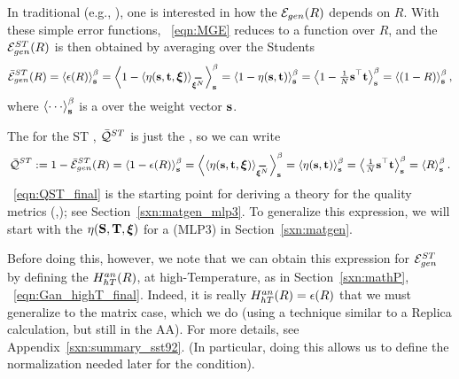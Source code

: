 
In traditional \STATMECH (e.g., \cite{SST92}), one is interested in how the \emph{\TotalModelGeneralizationError} ${\mathcal{E}}_{gen}(R)$ depends on $R$.
With these simple error functions, \EQN~\ref{eqn:MGE} reduces to a function over $R$,
and the \AverageSTGeneralizationError ${\mathcal{E}}^{ST}_{gen}(R)$ is then obtained by averaging over the Students 
\begin{align}
\label{eqn:AVGSTGE_R}
\AVGSTGE(R)=\THRMAVG{\EPSL(R)}=
\THRMAVG{1-\langle\ETA(\SVEC,\TVEC,\XI)\rangle_{\AVGNDXI}}=
\THRMAVG{1-\ETA(\SVEC,\TVEC)}=
\THRMAVG{1-\tfrac{1}{N}\SVEC^{\top}\TVEC}=
\THRMAVG{(1-R)}  ,
\end{align}
where $\THRMAVG{\cdots}$ is a \ThermalAverage over the \Student weight vector ${\mathbf{s}}$.

The \ModelQuality for the ST \Perceptron, $\bar{\mathcal{Q}}^{ST}$
is just the \AverageGeneralizationAccuracy, so we can write
\begin{align}
\label{eqn:QST_final}
\Q^{ST} := 1 - \AVGSTGE(R) 
       = \THRMAVG{1 - \EPSL(R)} 
       = \THRMAVG{\langle\ETA(\SVEC, \TVEC, \XI)\rangle_{\AVGNDXI}} 
       = \THRMAVG{\ETA(\SVEC, \TVEC)} 
       = \THRMAVG{\tfrac{1}{N}\SVEC^{\top}\TVEC} 
       = \THRMAVG{R}.
\end{align}
\EQN~\ref{eqn:QST_final} is the starting point for deriving a \SEMIEMP theory for the \WW quality metrics (\ALPHA,\ALPHAHAT);
see Section~\ref{sxn:matgen_mlp3}.
To generalize this expression, we will start with the \SelfOverlap $\eta({\mathbf{S}},{\mathbf{T}},\boldsymbol{\xi})$ for a
\MultiLayerPerceptron (MLP3) in Section~\ref{sxn:matgen}.

Before doing this, however, we note that 
we can obtain this expression for ${\mathcal{E}}^{ST}_{gen}$ by defining the
\AnnealedHamiltonian $H^{an}_{hT}(R)$, at high-Temperature, as in Section~\ref{sxn:mathP}, \EQN~\ref{eqn:Gan_highT_final}.
Indeed, it is really $H^{an}_{hT}(R)=\epsilon(R)$ that we must generalize to the matrix case, which we do (using a technique
similar to a Replica calculation, but still in the AA).
For more details, see Appendix~\ref{sxn:summary_sst92}.
(In particular, doing this allows us to define the normalization needed later for the \TRACELOG condition).


